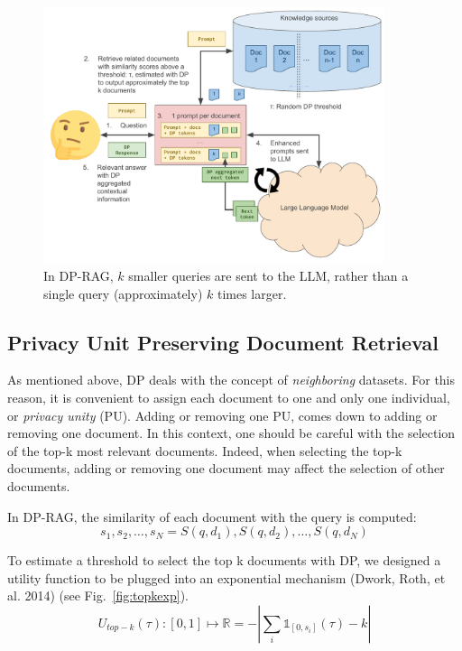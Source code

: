 \documentclass[
  12pt,
  a4paper,
]{article}
\begin{document}
\begin{figure}
\centering
\includegraphics[width=100mm,height=\textheight,keepaspectratio]{figures/DP-RAG.pdf}
\caption{In DP-RAG, \(k\) smaller queries are sent to the LLM, rather
than a single query (approximately) \(k\) times
larger.}\label{fig:dprag}
\end{figure}

\subsection{Privacy Unit Preserving Document
Retrieval}\label{privacy-unit-preserving-document-retrieval}

As mentioned above, DP deals with the concept of \emph{neighboring}
datasets. For this reason, it is convenient to assign each document to
one and only one individual, or \emph{privacy unity} (PU). Adding or
removing one PU, comes down to adding or removing one document. In this
context, one should be careful with the selection of the top-k most
relevant documents. Indeed, when selecting the top-k documents, adding
or removing one document may affect the selection of other documents.

In DP-RAG, the similarity of each document with the query is computed:
\[s_1, s_2,\ldots, s_N = S(q, d_1), S(q, d_2), \ldots, S(q, d_N)\]

To estimate a threshold to select the top k documents with DP, we
designed a utility function to be plugged into an exponential mechanism
(Dwork, Roth, et al. 2014) (see Fig.~\ref{fig:topkexp}).
\[U_{top-k}(\tau): [0, 1] \mapsto \mathbb{R} = -\left|\sum_i\mathbb{1}_{[0, s_i]}(\tau)-k\right|\]
\end{document}
